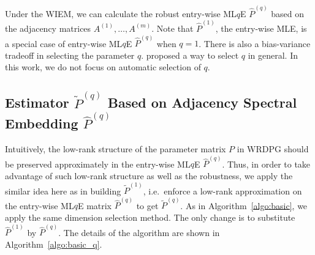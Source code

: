 \documentclass[a4paper]{article}
\renewcommand{\hat}{\widehat}
\begin{document}
Under the WIEM, we can calculate the robust entry-wise ML$q$E $\hat{P}^{(q)}$ based on the adjacency matrices $A^{(1)}, \dotsc, A^{(m)}$. Note that $\hat{P}^{(1)}$, the entry-wise MLE, is a special case of entry-wise ML$q$E $\hat{P}^{(q)}$ when $q = 1$. 
There is also a bias-variance tradeoff in selecting the parameter $q$. \citet{qin2017robust} proposed a way to select $q$ in general. In this work, we do not focus on automatic selection of $q$.



\subsection{Estimator $\widetilde{P}^{(q)}$ Based on Adjacency Spectral Embedding $\hat{P}^{(q)}$}

Intuitively, the low-rank structure of the parameter matrix $P$ in WRDPG should be preserved approximately in the entry-wise ML$q$E $\hat{P}^{(q)}$. Thus, in order to take advantage of such low-rank structure as well as the robustness, we apply the similar idea here as in building $\widetilde{P}^{(1)}$, i.e.\ enforce a low-rank approximation on the entry-wise ML$q$E matrix $\hat{P}^{(q)}$ to get $\widetilde{P}^{(q)}$. As in Algorithm~\ref{algo:basic}, we apply the same dimension selection method.
The only change is to substitute $\hat{P}^{(1)}$ by $\hat{P}^{(q)}$. The details of the algorithm are shown in Algorithm~\ref{algo:basic_q}.

\end{document}
